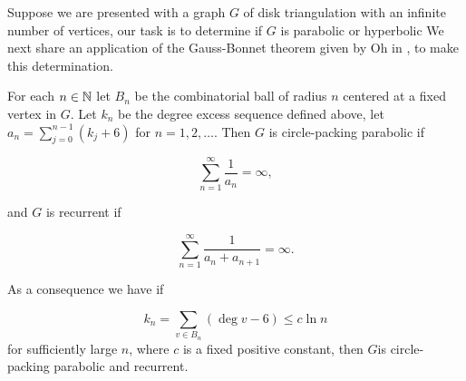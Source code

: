 Suppose we are presented with a graph $G$ of disk triangulation with an infinite 
number of vertices, our task is to determine if $G$ is parabolic or hyperbolic
We next share an application of the Gauss-Bonnet theorem given by Oh in \cite{oh_criteria_2022},
to make this determination.






For each $n\in\mathbb{N}$ let $B_n$ be the combinatorial ball of radius $n$
centered at a fixed vertex in $G.$ Let $k_n$ be the degree excess sequence
defined above, let $a_n=\sum_{j=0}^{n-1}(k_j+6)$ for $n=1,2,\ldots$.
Then $G$ is circle-packing parabolic if 

\begin{equation}\label{eqn:cp-parabolic}
\sum_{n=1}^{\infty}\frac{1}{a_n}=\infty,
\end{equation}

and $G$ is recurrent if

\begin{equation}\label{eqn:recurrent}
\sum_{n=1}^{\infty}\frac{1}{a_n+a_{n+1}}=\infty.
\end{equation}

As a consequence we have if

$$k_n=\sum_{v\in B_n}(\deg v -6)\leq c\ln n$$
for sufficiently large $n$, where $c$ is a fixed positive constant,
then $G$is circle-packing parabolic and recurrent.